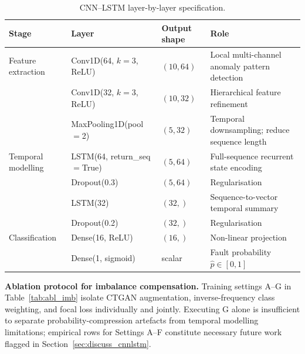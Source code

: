 \documentclass[sensors,article,submit,pdftex,moreauthors]{Definitions/mdpi}
\newcommand{\mdpitablefont}{\footnotesize}
\begin{document}
\begin{table}[H]
\caption{CNN--LSTM layer-by-layer specification.\label{tab:arch}}
\centering
\mdpitablefont
\begin{tabularx}{\textwidth}{lllX}
\toprule
\textbf{Stage} & \textbf{Layer} & \textbf{Output shape} & \textbf{Role} \\
\midrule
Feature extraction
  & Conv1D(64, $k{=}3$, ReLU)  & $(10, 64)$  & Local multi-channel anomaly pattern detection \\
  & Conv1D(32, $k{=}3$, ReLU)  & $(10, 32)$  & Hierarchical feature refinement \\
  & MaxPooling1D(pool$=$2)      & $(5, 32)$   & Temporal downsampling; reduce sequence length \\
Temporal modelling
  & LSTM(64, return\_seq$=$True)& $(5, 64)$   & Full-sequence recurrent state encoding \\
  & Dropout(0.3)                & $(5, 64)$   & Regularisation \\
  & LSTM(32)                    & $(32,)$     & Sequence-to-vector temporal summary \\
  & Dropout(0.2)                & $(32,)$     & Regularisation \\
Classification
  & Dense(16, ReLU)             & $(16,)$     & Non-linear projection \\
  & Dense(1, sigmoid)           & scalar      & Fault probability $\hat{p} \in [0,1]$ \\
\bottomrule
\end{tabularx}
\end{table}

\textbf{Ablation protocol for imbalance compensation.}
Training settings A--G in Table~\ref{tab:abl_imb} isolate CTGAN augmentation, inverse-frequency class weighting, and focal loss individually and jointly.
Executing G alone is insufficient to separate probability-compression artefacts from temporal modelling limitations; empirical rows for Settings A--F constitute necessary future work flagged in Section~\ref{sec:discuss_cnnlstm}.
\end{document}
